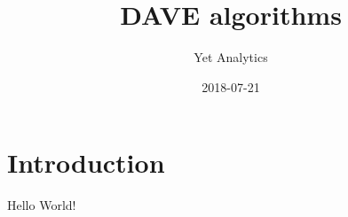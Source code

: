 \documentclass{article}
\title{DAVE algorithms}
\date{2018-07-21}
\author{Yet Analytics}
\begin{document}
\maketitle
\newpage
{}
\section*{Introduction}



Hello World!
\end{document}
